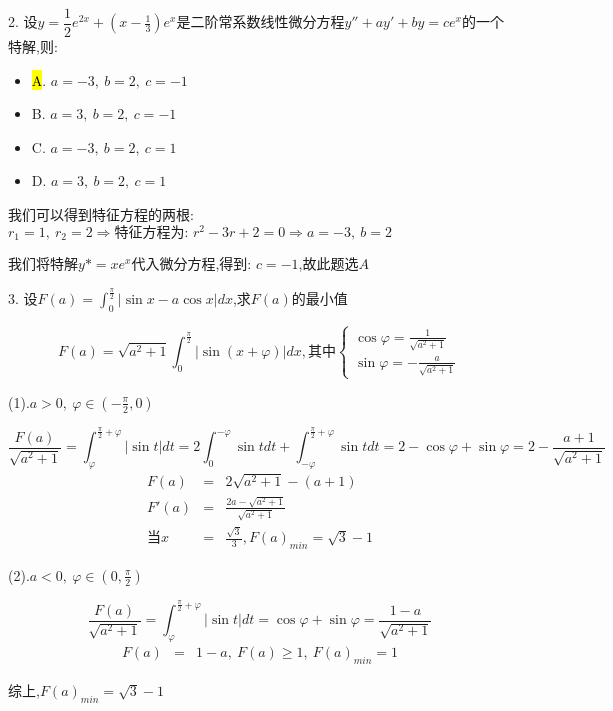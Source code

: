 2. 设$y=\dfrac{1}{2}e^{2x}+(x-\frac{1}{3})e^{x}$是二阶常系数线性微分方程$y''+ay'+by=ce^x$的一个特解,则: 
\begin{itemize}
	\item \hl{A}. $a=-3,\ b=2,\ c=-1$ 
	\item B. $a=3,\ b=2,\ c=-1$ 
	\item C. $a=-3,\ b=2,\ c=1$ 
	\item D. $a=3,\ b=2,\ c=1$ 
\end{itemize}
\begin{solution}
	
	我们可以得到特征方程的两根: $r_{1}=1,\ r_{2}=2\Rightarrow \text{特征方程为: }r^2-3r+2=0\Rightarrow a=-3,\ b=2$
	
	我们将特解$y{*}=xe^{x}$代入微分方程,得到: $c=-1$,故此题选$A$
\end{solution}


3. 设$F(a)=\int_{0}^{\frac{\pi}{2}}|\sin x-a\cos x|dx$,求$F(a)$的最小值
\begin{solution}
	
	$$F(a)=\sqrt{a^2+1}\int_{0}^{\frac{\pi}{2}}|\sin(x+\varphi)|dx,\text{其中}\left\lbrace 
	\begin{array}{l}
		\cos \varphi=\frac{1}{\sqrt{a^2+1}}\\
		\sin \varphi=-\frac{a}{\sqrt{a^2+1}}
	\end{array}
	\right. $$
	
	(1).$a>0,\ \varphi\in(-\frac{\pi}{2},0)$
	
	$$\frac{F(a)}{\sqrt{a^2+1}}=\int_{\varphi}^{\frac{\pi}{2}+\varphi}|\sin t|dt=2\int_{0}^{-\varphi}\sin tdt+\int_{-\varphi}^{\frac{\pi}{2}+\varphi}\sin tdt=2-\cos \varphi+\sin \varphi=2-\frac{a+1}{\sqrt{a^2+1}}$$
	\begin{eqnarray*}
		F(a)&=&2\sqrt{a^2+1}-(a+1)\\ F'(a)&=&\frac{2a-\sqrt{a^2+1}}{\sqrt{a^2+1}}\\
		\text{当}x&=&\frac{\sqrt{3}}{3},F(a)_{min}=\sqrt{3}-1
	\end{eqnarray*}
	
	(2).$a<0,\ \varphi\in(0,\frac{\pi}{2})$
	
	$$\frac{F(a)}{\sqrt{a^2+1}}=\int_{\varphi}^{\frac{\pi}{2}+\varphi}|\sin t|dt=\cos \varphi+\sin \varphi=\frac{1-a}{\sqrt{a^2+1}}$$
	\begin{eqnarray*}
		F(a)&=&1-a,\ F(a)\geq 1,\ F(a)_{min}=1
	\end{eqnarray*}
	
	综上,$F(a)_{min}=\sqrt{3}-1$
\end{solution}


